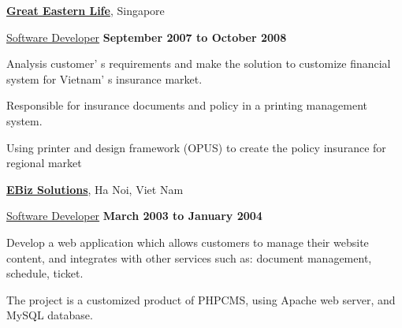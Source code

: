 \documentclass[10pt]{article}
\renewcommand\textit[1]{\underline{#1}}
\renewcommand{\section}[1]{\pagebreak[3]%
    \vspace{1.3\baselineskip}%
    \phantomsection\addcontentsline{toc}{section}{#1}%
    \noindent\llap{\scshape\smash{\parbox[t]{\marginparwidth}{\hyphenpenalty=10000\raggedright #1}}}%
    \vspace{-\baselineskip}\par}
\newcommand{\halfblankline}{\quad\vspace{-0.5\baselineskip}\pagebreak[3]}
\begin{document}
\halfblankline

\href{http://clear2pay.com/}{\textbf{Great Eastern Life}}, Singapore
\begin{outerlist}

\item[] \textit{Software Developer}%
        \hfill \textbf{September 2007 to October 2008}

	\begin{innerlist}

		\item  Analysis  customer' s  requirements  and make  the  solution  to  customize  financial  system for  Vietnam' s  insurance market.
		\item  Responsible  for  insurance  documents  and  policy  in  a  printing management  system.
		\item  Using  printer and  design  framework  (OPUS)  to  create  the  policy  insurance  for  regional market
	
	\end{innerlist}

\end{outerlist}

\halfblankline

\href{http://ebizvietnam.net/}{\textbf{EBiz Solutions}}, Ha Noi, Viet Nam
\begin{outerlist}

\item[] \textit{Software Developer}%
        \hfill \textbf{March 2003 to January 2004}
	
	\begin{innerlist}
		\item  Develop  a  web  application  which  allows  customers  to manage  their  website  content, and  integrates  with  other  services  such  as:   document management,   schedule,   ticket.
		\item The  project  is  a  customized  product  of  PHPCMS,   using  Apache  web  server,   and MySQL database.
	\end{innerlist}

\end{outerlist}

\halfblankline


%
\end{document}
